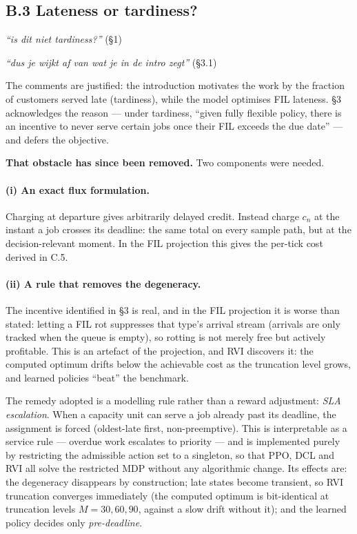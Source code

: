 \documentclass[11pt,a4paper]{article}
\newcommand{\comment}[1]{\textcolor{red!70!black}{\textit{``#1''}}}
\begin{document}
\subsection*{B.3 Lateness or tardiness?}

\comment{is dit niet tardiness?} \hfill (\S1)

\comment{dus je wijkt af van wat je in de intro zegt} \hfill (\S3.1)

The comments are justified: the introduction motivates the work by the fraction
of customers served late (tardiness), while the model optimises FIL lateness.
\S3 acknowledges the reason --- under tardiness, ``given fully flexible policy,
there is an incentive to never serve certain jobs once their FIL exceeds the due
date'' --- and defers the objective.

\textbf{That obstacle has since been removed.}  Two components were needed.

\paragraph{(i) An exact flux formulation.}
Charging at departure gives arbitrarily delayed credit.  Instead charge $c_n$ at
the instant a job crosses its deadline: the same total on every sample path, but
at the decision-relevant moment.  In the FIL projection this gives the
per-tick cost derived in C.5.

\paragraph{(ii) A rule that removes the degeneracy.}
The incentive identified in \S3 is real, and in the FIL projection it is worse
than stated: letting a FIL rot suppresses that type's arrival stream (arrivals
are only tracked when the queue is empty), so rotting is not merely free but
actively profitable.  This is an artefact of the projection, and RVI discovers
it: the computed optimum drifts below the achievable cost as the truncation
level grows, and learned policies ``beat'' the benchmark.

The remedy adopted is a modelling rule rather than a reward adjustment:
\emph{SLA escalation}.  When a capacity unit can serve a job already past its
deadline, the assignment is forced (oldest-late first, non-preemptive).  This is
interpretable as a service rule --- overdue work escalates to priority --- and is
implemented purely by restricting the admissible action set to a singleton, so
that PPO, DCL and RVI all solve the restricted MDP without any algorithmic
change.  Its effects are: the degeneracy disappears by construction; late states
become transient, so RVI truncation converges immediately (the computed optimum
is bit-identical at truncation levels $M = 30, 60, 90$, against a slow drift
without it); and the learned policy decides only \emph{pre-deadline}.
\end{document}
